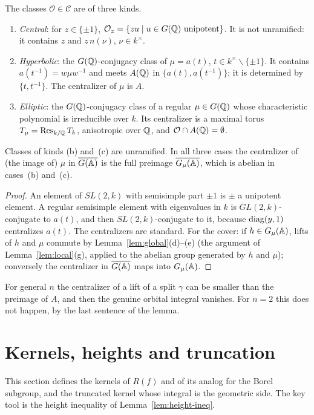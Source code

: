 \begin{lemma}\label{lem:classes}
The classes $\mathcal O\in\mathcal C$ are of three kinds.
\begin{enumerate}[label=(\alph*)]
\item \emph{Central}: for $z\in\{\pm1\}$, $\mathcal O_z=\{zu\mid
  u\in G(\mathbb{Q})\ \text{unipotent}\}$. It is not unramified: it contains $z$
  and $z\,n(\nu)$, $\nu\in k^\times$.
\item \emph{Hyperbolic}: the $G(\mathbb{Q})$-conjugacy class of $\mu=a(t)$,
  $t\in k^\times\smallsetminus\{\pm1\}$. It contains $a(t^{-1})=w\mu w^{-1}$
  and meets $A(\mathbb{Q})$ in $\{a(t),a(t^{-1})\}$; it is determined by
  $\{t,t^{-1}\}$. The centralizer of $\mu$ is $A$.
\item \emph{Elliptic}: the $G(\mathbb{Q})$-conjugacy class of a regular
  $\mu\in G(\mathbb{Q})$ whose characteristic polynomial is irreducible over $k$.
  Its centralizer is a maximal torus $T_\mu=\operatorname{Res}_{k/\mathbb{Q}}T_k$, anisotropic
  over $\mathbb{Q}$, and $\mathcal O\cap A(\mathbb{Q})=\emptyset$.
\end{enumerate}
Classes of kinds (b) and~(c) are unramified. In all three cases the
centralizer of (the image of) $\mu$ in $\overline{G(\mathbb{A})}$ is the full preimage
$\overline{G_\mu(\mathbb{A})}$, which is abelian in cases~(b) and~(c).
\end{lemma}

\begin{proof}
An element of $SL(2,k)$ with semisimple part $\pm1$ is $\pm$ a unipotent
element. A regular semisimple element with eigenvalues in $k$ is
$GL(2,k)$-conjugate to $a(t)$, and then $SL(2,k)$-conjugate to it,
because $\operatorname{diag}(y,1)$ centralizes $a(t)$. The centralizers are standard.
For the cover: if $h\in G_\mu(\mathbb{A})$, lifts of $h$ and $\mu$ commute by
Lemma~\ref{lem:global}(d)--(e) (the argument of
Lemma~\ref{lem:local}(g), applied to the abelian group generated by $h$
and $\mu$); conversely the centralizer in $\overline{G(\mathbb{A})}$ maps into $G_\mu(\mathbb{A})$.
\end{proof}

For general $n$ the centralizer of a lift of a split $\gamma$ can be
smaller than the preimage of $A$, and then the genuine orbital integral
vanishes. For $n=2$ this does not happen, by the last sentence of the
lemma.

\section{Kernels, heights and truncation}\label{sec:kernels}

This section defines the kernels of $R(f)$ and of its analog for the
Borel subgroup, and the truncated kernel whose integral is the geometric
side. The key tool is the height inequality of
Lemma~\ref{lem:height-ineq}.


